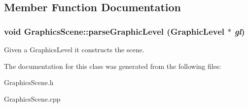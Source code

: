 \subsection{Member Function Documentation}
\hypertarget{classGraphicsScene_aaa5f151c3024d754665c7af92670592f}{
\subsubsection[{parseGraphicLevel}]{\setlength{\rightskip}{0pt plus 5cm}void GraphicsScene::parseGraphicLevel ({\bf GraphicLevel} $\ast$ {\em gl})}}
\label{classGraphicsScene_aaa5f151c3024d754665c7af92670592f}
Given a GraphicsLevel it constructs the scene. 

The documentation for this class was generated from the following files:\begin{DoxyCompactItemize}
\item 
GraphicsScene.h\item 
GraphicsScene.cpp\end{DoxyCompactItemize}
